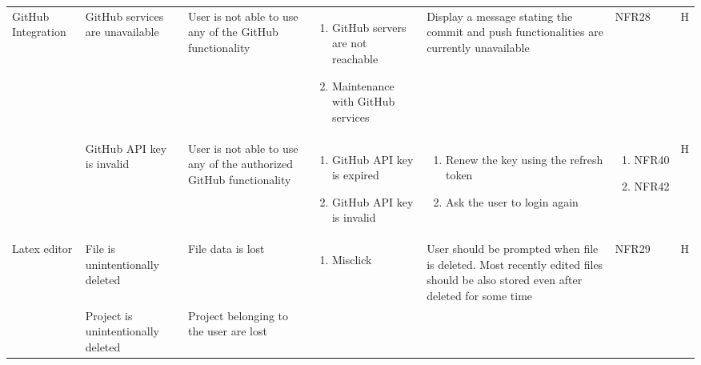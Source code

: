 \documentclass{article}
\begin{document}
\begin{longtable}{ | l | p{2.5cm} | p{3cm} | p{3cm} | p{3.5cm} | p{1.5cm} | c | }
			\multirow{2}{4em}{GitHub Integration} & GitHub services are unavailable & User is not able to use any of the GitHub functionality &
			\begin{enumerate}[leftmargin=*]
				\item GitHub servers are not reachable
				\item Maintenance with GitHub services
			\end{enumerate} 
			&
			Display a message stating the commit and push functionalities are currently unavailable
			&
			NFR28
			& H\newComponent-1\\
			\cline{2-7}
			& GitHub API key is invalid & User is not able to use any of the authorized GitHub functionality&
			\begin{enumerate}[leftmargin=*]
				\item GitHub API key is expired
				\item GitHub API key is invalid 
			\end{enumerate} 
			&
			\begin{enumerate}[leftmargin=*]
				\item Renew the key using the refresh token
				\item Ask the user to login again
			\end{enumerate} 
			&      
			\begin{enumerate}[leftmargin=*]
				\item NFR40
				\item NFR42
			\end{enumerate}
			& H\thecomponentNum-2\\
			\hline
			\multirow{2}{4em}{Latex editor} & File is unintentionally deleted & File data is lost & 
			\begin{enumerate}[leftmargin=*]
				\item Misclick
			\end{enumerate} &
			User should be prompted when file is deleted. Most recently edited files should be also stored even after deleted for some time
			& 
			NFR29
			& H\newComponent-1\\
			\cline{2-7}
			& Project is unintentionally deleted & Project belonging to the user are lost &
			\begin{enumerate}[leftmargin=*]

\end{enumerate}
\end{longtable}
\end{document}
